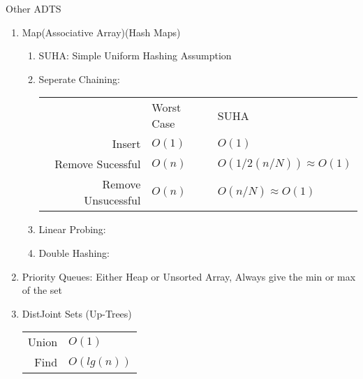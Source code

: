 \documentclass[12pt]{article}
\renewcommand{\=}[1]{\stackrel{#1}{=}} %
\theoremstyle{definition}
\theoremstyle{remark}
\begin{document}
\begin{enumerate}
\begin{enumerate}
\begin{enumerate}
      \end{enumerate}
    \end{enumerate}
    Other ADTS
    \begin{enumerate}
    \item Map(Associative Array)(Hash Maps)
      \begin{enumerate}
      \item SUHA: Simple Uniform Hashing Assumption
      \item Seperate Chaining:
        \begin{tabular}{r l l}
          & Worst Case & SUHA\\
          Insert & $O(1)$ & $O(1)$\\
          Remove Sucessful & $O(n)$ & $O(1/2(n/N))\approx{O(1)}$\\
          Remove Unsucessful & $O(n)$ & $O(n/N)\approx{O(1)}$
        \end{tabular}
      \item Linear Probing:
      \item Double Hashing:
      \end{enumerate}

    \item Priority Queues: Either Heap or Unsorted Array, Always give
      the min or max of the set
    \item DistJoint Sets (Up-Trees)
      \begin{tabular}{r l}
        Union & $O(1)$\\
        Find & $O(lg(n))$
      \end{tabular}

    \end{enumerate}
  \end{enumerate}
  
\end{document}
